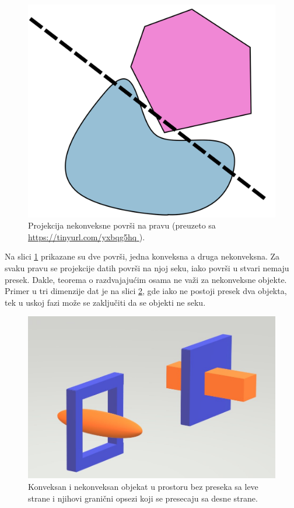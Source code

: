 \documentclass[12pt,oneside]{memoir}
\begin{document}
\begin{figure}[h!]
	\centering
	\includegraphics[scale=0.17]{theorem_counterexample.png}
	\caption{Projekcija nekonveksne površi na pravu (\tiny preuzeto sa \url{ https://tinyurl.com/yxbqg5hq }).}
	
	\label{fig:counter}
\end{figure}

Na slici \ref{fig:counter} prikazane su dve površi, jedna konveksna a druga nekonveksna. 
Za svaku pravu se projekcije datih površi na njoj seku, iako površi u stvari nemaju presek.
Dakle, teorema o razdvajajućim osama ne važi za nekonveksne objekte. 
Primer u tri dimenzije dat je na slici \ref{fig:falseCollision}, gde iako ne postoji presek dva objekta, 
tek u uskoj fazi može se zaključiti da se objekti ne seku.

\begin{figure}[h!]
	\centering
	\includegraphics[scale=0.5]{falseCollision.jpg}
	\caption{Konveksan i nekonveksan objekat u prostoru bez preseka sa leve strane i
	njihovi granični opsezi koji se presecaju sa desne strane. }
	\label{fig:falseCollision}
\end{figure}
\end{document}

